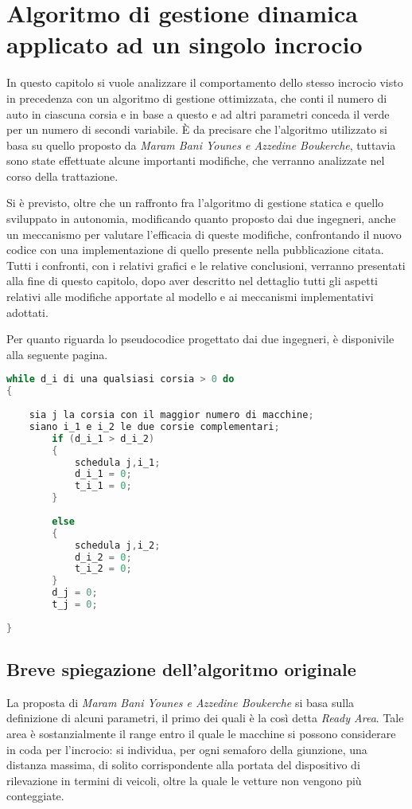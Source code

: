 \chapter{Algoritmo di gestione dinamica applicato ad un singolo incrocio}

In questo capitolo si vuole analizzare il comportamento dello stesso incrocio visto in precedenza con un algoritmo di gestione ottimizzata, che conti il numero di auto in ciascuna corsia e in base a questo e ad altri parametri conceda il verde per un numero di secondi variabile. È da precisare che l’algoritmo utilizzato si basa su quello proposto da \textit{Maram Bani Younes e Azzedine Boukerche}\cite{itlc}, tuttavia sono state effettuate alcune importanti modifiche, che verranno analizzate nel corso della trattazione. 

Si è previsto,  oltre che un raffronto fra l'algoritmo di gestione statica e quello sviluppato in autonomia, modificando quanto proposto dai due ingegneri, anche un meccanismo per valutare l'efficacia di queste modifiche, confrontando il nuovo codice con una implementazione di quello presente nella pubblicazione citata. Tutti i confronti, con i relativi grafici e le relative conclusioni, verranno presentati alla fine di questo capitolo, dopo aver descritto nel dettaglio tutti gli aspetti relativi alle modifiche apportate al modello e ai meccanismi implementativi adottati.


Per quanto riguarda lo pseudocodice progettato dai due ingegneri, è disponivile alla seguente pagina.
\newpage
\begin{lstlisting}[language=C,label=pseudocode,caption=Pseudocodice di gestione dinamica di un incrocio]
while d_i di una qualsiasi corsia > 0 do
{
	
	sia j la corsia con il maggior numero di macchine;
	siano i_1 e i_2 le due corsie complementari;
		if (d_i_1 > d_i_2)
		{
			schedula j,i_1;
			d_i_1 = 0;
			t_i_1 = 0;
		}
		
		else
		{
			schedula j,i_2;
			d_i_2 = 0;
			t_i_2 = 0;
		}
		d_j = 0;
		t_j = 0;
	
}   
\end{lstlisting}
\newpage
\section{Breve spiegazione dell'algoritmo originale}
La proposta di \textit{Maram Bani Younes e Azzedine Boukerche} si basa sulla definizione di alcuni parametri, il primo dei quali è la così detta \textit{Ready Area}. Tale area è sostanzialmente il range entro il quale le macchine si possono considerare in coda per l’incrocio: si individua, per ogni semaforo della giunzione, una distanza massima, di solito corrispondente alla portata del dispositivo di rilevazione in termini di veicoli, oltre la quale le vetture non vengono più conteggiate. 

